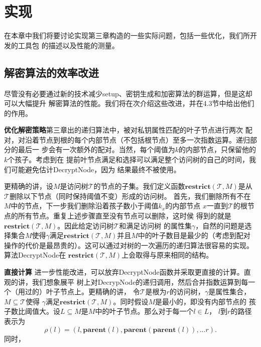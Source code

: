 \chapter{实现}
在本章中我们将要讨论实现第三章构造的一些实际问题，包括一些优化，我们所开发的工具包
的描述以及性能的测量。
\section{解密算法的效率改进}
尽管没有必要通过新的技术减少setup、密钥生成和加密算法的群运算，但是这却可以大幅提升
解密算法的性能。我们将在次介绍这些改进，并在4.3节中给出他们的作用。\par
\vspace{5mm}
\textbf{优化解密策略}\quad 第三章出的递归算法中，被对私钥属性匹配的叶子节点进行两次
配对，对沿着节点到根的每个内部节点（不包括根节点）至多一次指数运算。递归部分的最后一
步会有一次额外的配对。当然，每个阈值为$k$的内部节点，只保留他的$k$个孩子。考虑到在
提前叶节点满足和选择可以满足整个访问树的自己的时间，我们可能避免估计DecryptNode，因为
结果最终不被使用。\par
更精确的讲，设$M$是访问树$\mathcal{T}$的节点的子集。我们定义函数$\mathbf{restrict}(
\mathcal{T},M)$是从$\mathcal{T}$删除以下节点（同时保持阈值不变）形成的访问树。
首先，我们删除所有不在$M$中的节点，下一步我们删除沿着孩子数小于阈值$k_x$的内部节点
$x$一直到$\mathcal{T}$的根节点的所有节点。重复上述步骤直至没有节点可以删除，这时侯
得到的就是$\mathbf{restrict}(\mathcal{T},M)$。因此给定访问树$\mathcal{T}$和满足访问树
的属性集$\gamma$，自然的问题是选择集合$M$使得$\gamma$满足$\mathbf{restrict}(
\mathcal{T},M)$并且$M$中的叶子数目是最少的（考虑到配对操作的代价是最昂贵的）。这可以通过对树的一次遍历的递归算法很容易的实现。算法DecryptNode在
$\mathbf{restrict}(\mathcal{T},M)$上会取得与原来相同的结构。\par
\vspace{5mm}
\textbf{直接计算}\quad
进一步性能改进，可以放弃DecryptNode函数并采取更直接的计算。直观的讲，我们想象展平
树上对DecrypNode的递归调用，然后合并指数运算到每一个（用过的）叶子节点上。更精确的讲，
令$\mathcal{T}$是根为$r$的访问树，$\gamma$是属性集合，$M \subseteq \mathcal{T}$使得
$\gamma$满足$\mathbf{restrict}(\mathcal{T},M)$。同时假设$M$是最小的，即没有内部节点的
孩子数比阈值大。设$L \subseteq M$是$M$中的叶子节点。那么对于每一个$l \in L$，
$l$到$r$的路径表示为
$$\rho(l)=(l,\mathbf{parent}(l),\mathbf{parent}(\mathbf{parent}(l)),...r) .$$
同时，

